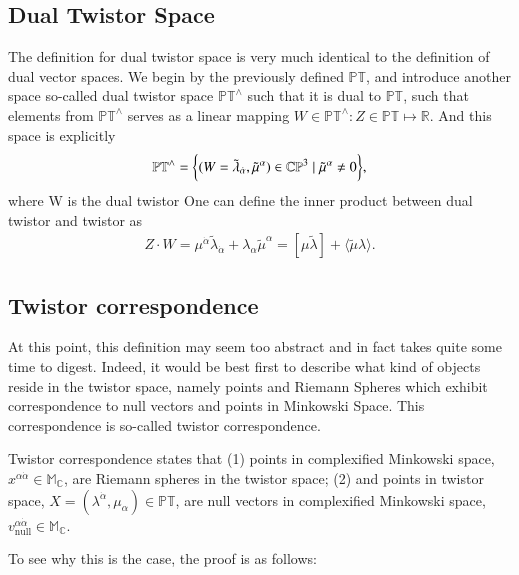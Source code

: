 \documentclass{article}
\begin{document}
 \subsection{Dual Twistor Space}%
  \label{sub: Dual Twistor Space}
  The definition for dual twistor space is very much identical to the
  definition of dual vector spaces. We begin by the previously defined $
  \mathbb{PT}$, and introduce another space so-called dual twistor
  space $ \mathbb{PT}^{\wedge} $ such that it is dual to $\mathbb{PT}$,
  such that elements from $\mathbb{PT}^{\wedge}$ serves as a linear
  mapping $W \in \mathbb{PT}^{\wedge}: Z \in \mathbb{PT} \mapsto
  \mathbb{R}$. And this space is explicitly 
  \begin{align}
    \label{dual twistor space}
    \mathbb{PT}^{\wedge} = \bigg{\{}
    ( W = \tilde\lambda_{\dot{\alpha}}, \tilde\mu^{\alpha}) \in
    \mathbb{CP}^{3} \mid \tilde\mu^{\alpha} \neq 0
    \bigg{\}}, 
  \end{align} 
  where W is the dual twistor
One can define the inner product between dual twistor and twistor as
\begin{align}
  \label{twistor inner product}
  Z \cdot W =  \mu^{\dot{\alpha}} \tilde\lambda_{\dot{\alpha}}  + 
  \lambda_{\alpha} \tilde\mu^{\alpha} = [\mu \tilde \lambda] + \langle \tilde \mu \lambda \rangle.
\end{align}


\subsection{Twistor correspondence}%
  \label{sub: Twistor correspondence}

 At this point, this definition may seem too abstract and in fact takes
quite some time to digest. Indeed, it would be best first to
describe what kind of objects reside in the twistor space, namely points and
Riemann Spheres which exhibit correspondence to null vectors and points in
Minkowski Space. This correspondence is so-called twistor
correspondence.

 Twistor correspondence states that (1) points in complexified Minkowski space, $x^{\alpha
 \dot{\alpha}} \in \mathbb{M_C}$, are Riemann spheres in the twistor
 space; (2) and points in twistor space, $ X =
 (\lambda^{\dot{\alpha}}, \mu_{\alpha}) \in \mathbb{PT} $, are null
 vectors in complexified Minkowski space, $ v^{\alpha
 \dot{\alpha}}_{\text{null}} \in \mathbb{M_{C}} $.

 To see why this is the case, the proof is as follows:
\end{document}
